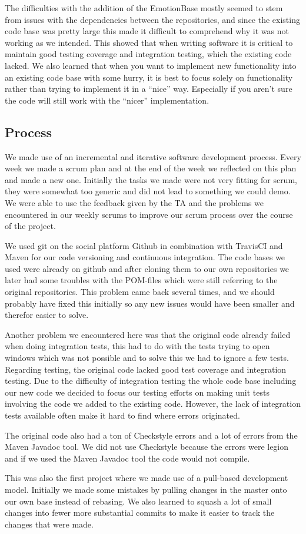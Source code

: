 \documentclass[]{article}
\begin{document}
The difficulties with the addition of the EmotionBase mostly seemed to stem from issues with the dependencies between the repositories, and since the existing code base was pretty large this made it difficult to comprehend why it was not working as we intended. This showed that when writing software it is critical to maintain good testing coverage and integration testing, which the existing code lacked. We also learned that when you want to implement new functionality into an existing code base with some hurry, it is best to focus solely on functionality rather than trying to implement it in a “nice” way. Especially if you aren’t sure the code will still work with the “nicer” implementation.

\subsection{Process}
We made use of an incremental and iterative software development process. Every week we made a scrum plan and at the end of the week we reflected on this plan and made a new one. Initially the tasks we made were not very fitting for scrum, they were somewhat too generic and did not lead to something we could demo. We were able to use the feedback given by the TA and the problems we encountered in our weekly scrums to improve our scrum process over the course of the project. \par 
We used git on the social platform Github in combination with TravisCI and Maven for our code versioning and continuous integration. The code bases we used were already on github and after cloning them to our own repositories we later had some troubles with the POM-files which were still referring to the original repositories. This problem came back several times, and we should probably have fixed this initially so any new issues would have been smaller and therefor easier to solve. \par 
Another problem we encountered here was that the original code already failed when doing integration tests, this had to do with the tests trying to open windows which was not possible and to solve this we had to ignore a few tests. Regarding testing, the original code lacked good test coverage and integration testing. Due to the difficulty of integration testing the whole code base including our new code we decided to focus our testing efforts on making unit tests involving the code we added to the existing code. However, the lack of integration tests available often make it hard to find where errors originated.  \par 
The original code also had a ton of Checkstyle errors and a lot of errors from the Maven Javadoc tool. We did not use Checkstyle because the errors were legion and if we used the Maven Javadoc tool the code would not compile. \par
This was also the first project where we made use of a pull-based development model. Initially we made some mistakes by pulling changes in the master onto our own base instead of rebasing. We also learned to squash a lot of small changes into fewer more substantial commits to make it easier to track the changes that were made. 
\clearpage
\end{document}

